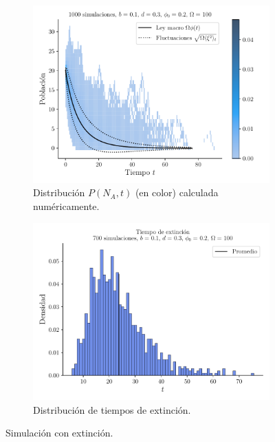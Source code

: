 \documentclass[twocolumn,aps,prl]{revtex4-1}
\begin{document}
\begin{figure}[ht!]
  \centering
  \begin{subfigure}[b]{0.49\linewidth}
      \centering
      \includegraphics[width = 0.999\textwidth]{figuras/ex03-c.pdf}
      \caption{Distribución $P(N_A,t)$ (en color) calculada numéricamente.}
      \label{fig:figuras/ex03-c}
  \end{subfigure}\quad
  \begin{subfigure}[b]{0.49\linewidth}
      \centering
      \includegraphics[width = 0.999\textwidth]{figuras/ex03-e.pdf}
      \caption{Distribución de tiempos de extinción.}
      \label{fig:figuras/ex03-e}
  \end{subfigure}\quad
  \caption{Simulación con extinción.}
  \label{fig:figuras/ex03-kill}
\end{figure}
\end{document}
